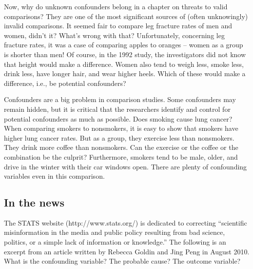 \documentclass[11pt]{book}\usepackage[]{graphicx}\usepackage[]{color}
\begin{document}
Now, why do unknown confounders belong in a chapter on threats to valid comparisons?  They are one of the most significant sources of (often unknowingly) invalid comparisons.  It seemed fair to compare leg fracture rates of men and women, didn't it?  What's wrong with that?  Unfortunately, concerning leg fracture rates, it was a case of comparing apples to oranges -- women as a group is shorter than men!  Of course, in the 1992 study, the investigators did not know that height would make a difference.  Women also tend to weigh less, smoke less, drink less, have longer hair, and wear higher heels.  Which of these would make a difference, i.e., be potential confounders?

Confounders are a big problem in comparison studies.  Some confounders may remain hidden, but it is critical that the researchers identify and control for potential confounders as much as possible.  Does smoking cause lung cancer?  When comparing smokers to nonsmokers, it is easy to show that smokers have higher lung cancer rates.  But as a group, they exercise less than nonsmokers.  They drink more coffee than nonsmokers.  Can the exercise or the coffee or the combination be the culprit?  Furthermore, smokers tend to be male, older, and drive in the winter with their car windows open.  There are plenty of confounding variables even in this comparison.

\subsection{In the news}

The STATS website (http://www.stats.org/) is dedicated to correcting ``scientific
misinformation in the media and public policy resulting from bad science,
politics, or a simple lack of information or knowledge.''  The following is an excerpt from an article written by Rebecca Goldin and Jing Peng in August 2010.  What is the confounding variable?  The probable cause? The outcome variable?
\end{document}
